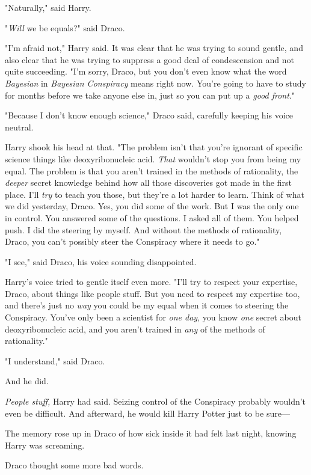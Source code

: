 "Naturally," said Harry.

"\emph{Will} we be equals?" said Draco.

"I'm afraid not," Harry said. It was clear that he was trying to sound gentle,
and also clear that he was trying to suppress a good deal of condescension and
not quite succeeding. "I'm sorry, Draco, but you don't even know what the word
\emph{Bayesian} in \emph{Bayesian Conspiracy} means right now. You're going to
have to study for months before we take anyone else in, just so you can put up
a \emph{good front}."

"Because I don't know enough science," Draco said, carefully keeping his voice
neutral.

Harry shook his head at that. "The problem isn't that you're ignorant of
specific science things like deoxyribonucleic acid. \emph{That} wouldn't stop
you from being my equal. The problem is that you aren't trained in the methods
of rationality, the \emph{deeper} secret knowledge behind how all those
discoveries got made in the first place. I'll \emph{try} to teach you those,
but they're a lot harder to learn. Think of what we did yesterday, Draco. Yes,
you did some of the work. But I was the only one in control. You answered some
of the questions. I asked all of them. You helped push. I did the steering by
myself. And without the methods of rationality, Draco, you can't possibly steer
the Conspiracy where it needs to go."

"I see," said Draco, his voice sounding disappointed.

Harry's voice tried to gentle itself even more. "I'll try to respect your
expertise, Draco, about things like people stuff. But you need to respect my
expertise too, and there's just no \emph{way} you could be my equal when it
comes to steering the Conspiracy. You've only been a scientist for \emph{one
day}, you know \emph{one} secret about deoxyribonucleic acid, and you aren't
trained in \emph{any} of the methods of rationality."

"I understand," said Draco.

And he did.

\emph{People stuff,} Harry had said. Seizing control of the Conspiracy probably
wouldn't even be difficult. And afterward, he would kill Harry Potter just to
be sure---

The memory rose up in Draco of how sick inside it had felt last night, knowing
Harry was screaming.

Draco thought some more bad words.

